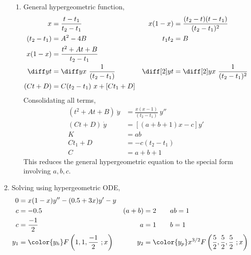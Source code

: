 \begin{enumerate}
\begin{enumerate}
              \item General hypergeometric function,
                    \begin{align}
                        x           & = \frac{t - t_1}{t_2 - t_1}                &
                        x(1-x)      & = \frac{(t_2 - t)(t - t_1)}{(t_2 - t_1)^2}   \\
                        (t_2 - t_1) & = A^2 - 4B                                 &
                        t_1 t_2     & = B                                          \\
                        x(1-x)      & = \frac{t^2 + At + B}{t_2 - t_1}             \\
                        \diff yt    & = \diff yx\ \frac{1}{(t_2 - t_1)}          &
                        \diff[2] yt & = \diff[2]yx\ \frac{1}{(t_2 - t_1)^2}        \\
                        (Ct + D)    & = C(t_2 - t_1)\ x + [C t_1 + D]            &
                    \end{align}
                    Consolidating all terms,
                    \begin{align}
                        (t^2 + At + B)\ \ddot{y} & = \frac{x(x-1)}{(t_2 - t_1)}\ y'' \\
                        (Ct + D)\ \dot{y}        & = [(a+b+1)x - c] y'               \\
                        K                        & = ab                              \\
                        Ct_1 + D                 & = -c(t_2 - t_1)                   \\
                        C                        & = a + b + 1
                    \end{align}
                    This reduces the general hypergeometric equation to the special form
                    involving $ a,b,c $.
          \end{enumerate}

    \item Solving using hypergeometric ODE,
          \begin{align}
              0     & = x(1-x)y'' - (0.5 + 3x)y' - y                       \\
              c     & = -0.5                                             &
              (a+b) & = 2 \qquad ab = 1                                    \\
              c     & = \frac{-1}{2}                                     &
              a     & = 1 \qquad b = 1                                     \\
              y_1   & = \color{y_h} F\left( 1,1,\frac{-1}{2}\ ;x \right) &
              y_2   & = \color{y_p} x^{3/2}F \left(
              \frac{5}{2}, \frac{5}{2}, \frac{5}{2}\ ;x \right)
          \end{align}


\end{enumerate}
